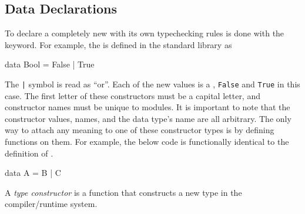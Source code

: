 \subsection{Data Declarations}\label{subsec:Data_Declarations}
To declare a completely new  with its own typechecking rules is done with the  keyword.
For example, the   is defined in the standard library as
\begin{haskellsource}
data Bool = False | True
\end{haskellsource}

The \texttt{|} symbol is read as ``or''.
Each of the new values is a , \texttt{False} and \texttt{True} in this case.
The first letter of these constructors must be a capital letter, and constructor names must be unique to modules.
It is important to note that the constructor values, names, and the data type's name are all arbitrary.
The only way to attach any meaning to one of these constructor types is by defining functions on them.
For example, the below code is functionally identical to the definition of .
\begin{haskellsource}
data A = B | C
\end{haskellsource}

\begin{definition}\label{def:Type_Constructor}
  A \emph{type constructor} is a function that constructs a new type in the compiler/runtime system.
\end{definition}



